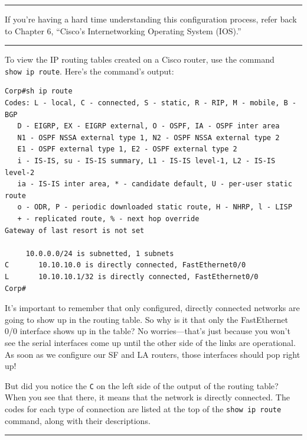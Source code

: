 \begin{center}\rule{0.5\linewidth}{0.5pt}\end{center}

If you're having a hard time
understanding this configuration process, refer back to Chapter 6,
``Cisco's Internetworking Operating System (IOS).''

\begin{center}\rule{0.5\linewidth}{0.5pt}\end{center}

\protect\hypertarget{c09.xhtmlux5cux23Page_375}{}{}To view the IP
routing tables created on a Cisco router, use the command
\texttt{show\ ip\ route}. Here's the command's output:

\begin{verbatim}
Corp#sh ip route
Codes: L - local, C - connected, S - static, R - RIP, M - mobile, B - BGP
   D - EIGRP, EX - EIGRP external, O - OSPF, IA - OSPF inter area
   N1 - OSPF NSSA external type 1, N2 - OSPF NSSA external type 2
   E1 - OSPF external type 1, E2 - OSPF external type 2
   i - IS-IS, su - IS-IS summary, L1 - IS-IS level-1, L2 - IS-IS level-2
   ia - IS-IS inter area, * - candidate default, U - per-user static route
   o - ODR, P - periodic downloaded static route, H - NHRP, l - LISP
   + - replicated route, % - next hop override
Gateway of last resort is not set
 
     10.0.0.0/24 is subnetted, 1 subnets
C       10.10.10.0 is directly connected, FastEthernet0/0
L       10.10.10.1/32 is directly connected, FastEthernet0/0
Corp#
\end{verbatim}

It's important to remember that only configured, directly connected
networks are going to show up in the routing table. So why is it that
only the FastEthernet 0/0 interface shows up in the table? No
worries---that's just because you won't see the serial interfaces come
up until the other side of the links are operational. As soon as we
configure our SF and LA routers, those interfaces should pop right up!

But did you notice the \texttt{C} on the left side of the output of the
routing table? When you see that there, it means that the network is
directly connected. The codes for each type of connection are listed at
the top of the \texttt{show\ ip\ route} command, along with their
descriptions.

\begin{center}\rule{0.5\linewidth}{0.5pt}\end{center}

